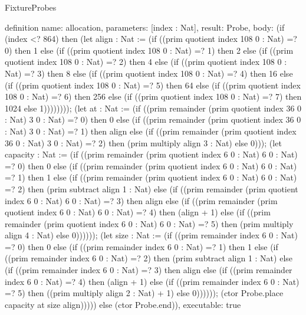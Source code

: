 \begin{lexlean}{FixtureProbes}
\begin{semanticmodule}
definition{
  name: allocation,
  parameters: [index : Nat],
  result: Probe,
  body: (if (index <? 864) then (let align : Nat := (if ((prim quotient index 108 0 : Nat) =? 0) then 1 else (if ((prim quotient index 108 0 : Nat) =? 1) then 2 else (if ((prim quotient index 108 0 : Nat) =? 2) then 4 else (if ((prim quotient index 108 0 : Nat) =? 3) then 8 else (if ((prim quotient index 108 0 : Nat) =? 4) then 16 else (if ((prim quotient index 108 0 : Nat) =? 5) then 64 else (if ((prim quotient index 108 0 : Nat) =? 6) then 256 else (if ((prim quotient index 108 0 : Nat) =? 7) then 1024 else 1)))))))); (let at : Nat := (if ((prim remainder (prim quotient index 36 0 : Nat) 3 0 : Nat) =? 0) then 0 else (if ((prim remainder (prim quotient index 36 0 : Nat) 3 0 : Nat) =? 1) then align else (if ((prim remainder (prim quotient index 36 0 : Nat) 3 0 : Nat) =? 2) then (prim multiply align 3 : Nat) else 0))); (let capacity : Nat := (if ((prim remainder (prim quotient index 6 0 : Nat) 6 0 : Nat) =? 0) then 0 else (if ((prim remainder (prim quotient index 6 0 : Nat) 6 0 : Nat) =? 1) then 1 else (if ((prim remainder (prim quotient index 6 0 : Nat) 6 0 : Nat) =? 2) then (prim subtract align 1 : Nat) else (if ((prim remainder (prim quotient index 6 0 : Nat) 6 0 : Nat) =? 3) then align else (if ((prim remainder (prim quotient index 6 0 : Nat) 6 0 : Nat) =? 4) then (align + 1) else (if ((prim remainder (prim quotient index 6 0 : Nat) 6 0 : Nat) =? 5) then (prim multiply align 4 : Nat) else 0)))))); (let size : Nat := (if ((prim remainder index 6 0 : Nat) =? 0) then 0 else (if ((prim remainder index 6 0 : Nat) =? 1) then 1 else (if ((prim remainder index 6 0 : Nat) =? 2) then (prim subtract align 1 : Nat) else (if ((prim remainder index 6 0 : Nat) =? 3) then align else (if ((prim remainder index 6 0 : Nat) =? 4) then (align + 1) else (if ((prim remainder index 6 0 : Nat) =? 5) then ((prim multiply align 2 : Nat) + 1) else 0)))))); (ctor Probe.place capacity at size align))))) else (ctor Probe.end)),
  executable: true
}


\end{semanticmodule}
\end{lexlean}
